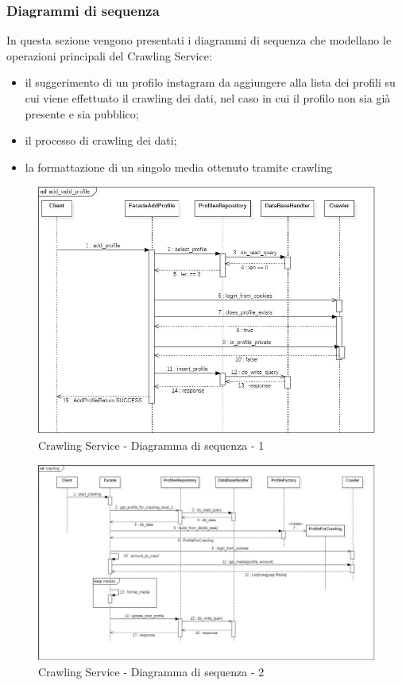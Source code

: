 \subsubsection{Diagrammi di sequenza}
In questa sezione vengono presentati i diagrammi di sequenza che modellano le operazioni principali del Crawling Service:
\begin{itemize}
    \item il suggerimento di un profilo instagram da aggiungere alla lista dei profili su cui viene effettuato il crawling dei dati, nel caso in cui il profilo non sia già presente e sia pubblico;
    \item il processo di crawling dei dati;
    \item la formattazione di un singolo media ottenuto tramite crawling
\end{itemize}
\begin{figure}[h]
    \centering
    \includegraphics[scale=0.65]{Contenuto/Immagini/seq1-CS.JPG}
    \caption{Crawling Service - Diagramma di sequenza - 1}
\end{figure}
\begin{figure}[h]
    \centering
    \includegraphics[scale=0.55]{Contenuto/Immagini/seq2-CS.JPG}
    \caption{Crawling Service - Diagramma di sequenza - 2}
\end{figure}
